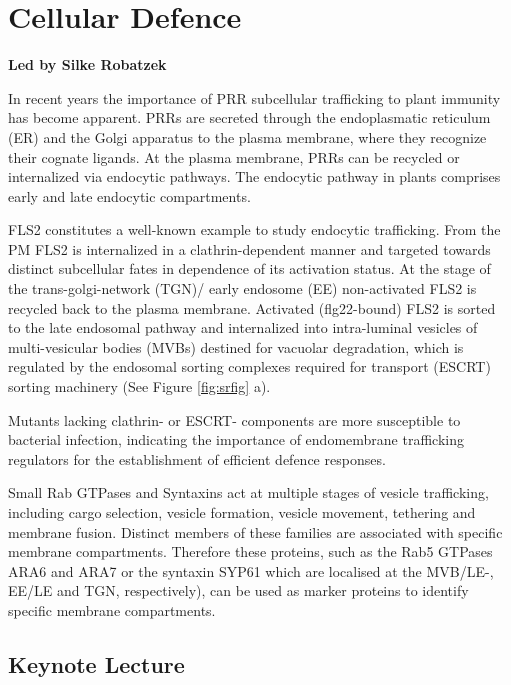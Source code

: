 \documentclass[12pt,]{book}
\begin{document}
\chapter*{Cellular Defence}\label{cellular-defence}

\textbf{Led by Silke Robatzek}

In recent years the importance of PRR subcellular trafficking to plant
immunity has become apparent. PRRs are secreted through the
endoplasmatic reticulum (ER) and the Golgi apparatus to the plasma
membrane, where they recognize their cognate ligands. At the plasma
membrane, PRRs can be recycled or internalized via endocytic pathways.
The endocytic pathway in plants comprises early and late endocytic
compartments.

FLS2 constitutes a well-known example to study endocytic trafficking.
From the PM FLS2 is internalized in a clathrin-dependent manner and
targeted towards distinct subcellular fates in dependence of its
activation status. At the stage of the trans-golgi-network (TGN)/ early
endosome (EE) non-activated FLS2 is recycled back to the plasma
membrane. Activated (flg22-bound) FLS2 is sorted to the late endosomal
pathway and internalized into intra-luminal vesicles of multi-vesicular
bodies (MVBs) destined for vacuolar degradation, which is regulated by
the endosomal sorting complexes required for transport (ESCRT) sorting
machinery (See Figure \ref{fig:srfig} a).

Mutants lacking clathrin- or ESCRT- components are more susceptible to
bacterial infection, indicating the importance of endomembrane
trafficking regulators for the establishment of efficient defence
responses.

Small Rab GTPases and Syntaxins act at multiple stages of vesicle
trafficking, including cargo selection, vesicle formation, vesicle
movement, tethering and membrane fusion. Distinct members of these
families are associated with specific membrane compartments. Therefore
these proteins, such as the Rab5 GTPases ARA6 and ARA7 or the syntaxin
SYP61 which are localised at the MVB/LE-, EE/LE and TGN, respectively),
can be used as marker proteins to identify specific membrane
compartments.

\section*{Keynote Lecture}\label{keynote-lecture-4}
\end{document}
